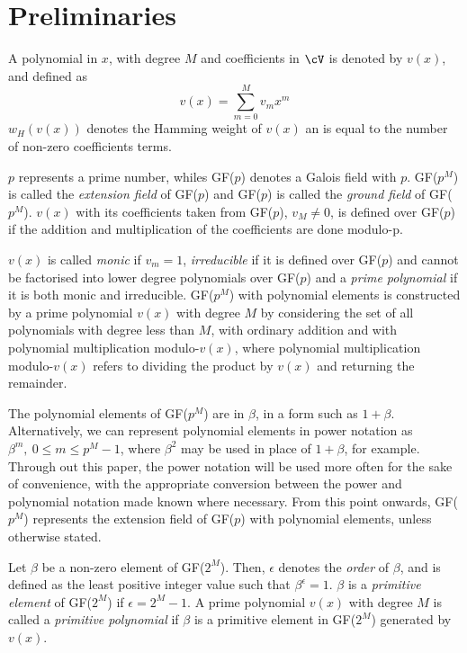 \section{Preliminaries}
\label{secPrelim}

A polynomial in $x$, with degree $M$ and coefficients in $\cV$ is denoted by $v(x)$, and defined as 
\begin{equation*}
v(x) = \sum_{m=0}^{M} v_mx^m
\end{equation*}
 $w_H(v(x))$ denotes the Hamming weight of $v(x)$ an is equal to the number of non-zero coefficients terms.

$p$ represents a prime number, whiles GF($p$) denotes a Galois field with $p$. GF($p^M$) is called the \textit{extension field} of GF($p$) and GF($p$) is called the \textit{ground field} of GF($p^M$).
$v(x)$ with its coefficients taken from GF($p$), $v_M \neq 0$,  is defined over GF($p$) if the addition and multiplication of the coefficients are done modulo-p.

$v(x)$ is called \textit{monic} if $v_m=1$, \textit{irreducible} if it is defined over GF($p$) and cannot be factorised into lower degree polynomials over GF($p$) and a \textit{prime polynomial} if it is both monic and irreducible. GF($p^M$) with polynomial elements is constructed by a prime polynomial $v(x)$  with degree $M$ by considering the set of all polynomials with degree less than $M$, with ordinary addition and with polynomial multiplication modulo-$v(x)$, where polynomial multiplication modulo-$v(x)$ refers to dividing the product by $v(x)$ and returning the remainder.

The polynomial elements of GF($p^M$) are in $\beta$, in a form such as $1+\beta$. Alternatively, we can represent polynomial elements in power notation as $\beta^m,~0 \leq m \leq p^M-1$, where $\beta^2$ may be used in place of $1+\beta$, for example. Through out this paper, the power notation will be used more often for the sake of convenience, with the appropriate conversion between the power and polynomial notation made known where necessary. From this point onwards, GF($p^M$) represents the extension field of GF($p$) with polynomial elements, unless otherwise stated.

Let $\beta$ be a non-zero element of GF($2^M$). Then, $\epsilon$ denotes the \textit{order} of $\beta$, and is defined as the least positive integer value such that $\beta^{\epsilon}=1$. $\beta$ is a \textit{primitive element} of GF($2^M$) if $\epsilon=2^M-1$. A prime polynomial $v(x)$ with degree $M$ is called a \textit{primitive polynomial} if $\beta$ is a primitive element in GF($2^M$) generated by $v(x)$. 

